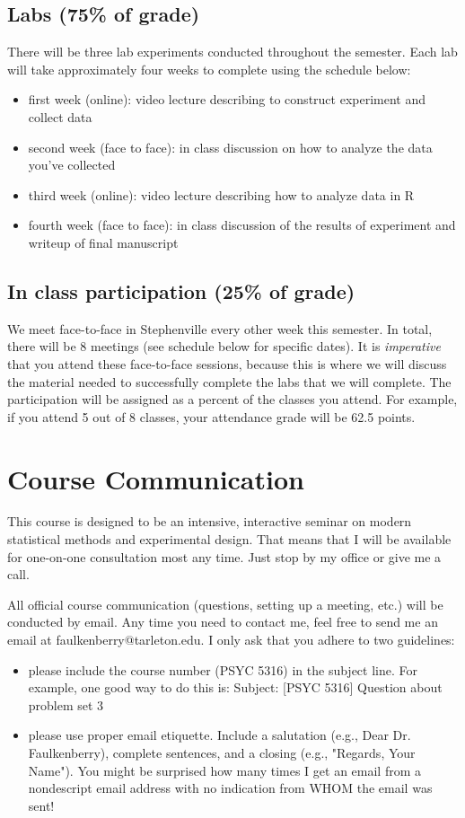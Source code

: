 \documentclass[10pt]{article}
\begin{document}
\subsection*{Labs (75\% of grade)}
\label{sec-5-1}
There will be three lab experiments conducted throughout the semester.  Each lab will take approximately four weeks to complete using the schedule below:

\begin{itemize}
\item first week (online): video lecture describing to construct experiment and collect data
\item second week (face to face): in class discussion on how to analyze the data you've collected
\item third week (online): video lecture describing how to analyze data in R
\item fourth week (face to face): in class discussion of the results of experiment and writeup of final manuscript
\end{itemize}

\subsection*{In class participation (25\% of grade)}
\label{sec-5-2}

We meet face-to-face in Stephenville every other week this semester.  In total, there will be 8 meetings (see schedule below for specific dates).  It is \emph{imperative} that you attend these face-to-face sessions, because this is where we will discuss the material needed to successfully complete the labs that we will complete.  The participation will be assigned as a percent of the classes you attend. For example, if you attend 5 out of 8 classes, your attendance grade will be 62.5 points.

\section*{Course Communication}
\label{sec-6}

This course is designed to be an intensive, interactive seminar on modern statistical methods and experimental design.  That means that I will be available for one-on-one consultation most any time.  Just stop by my office or give me a call.

All official course communication (questions, setting up a meeting, etc.) will be conducted by email.  Any time you need to contact me, feel free to send me an email at faulkenberry@tarleton.edu.  I only ask that you adhere to two guidelines:
\begin{itemize}
\item please include the course number (PSYC 5316) in the subject line.  For example, one good way to do this is:  Subject: [PSYC 5316] Question about problem set 3
\item please use proper email etiquette.  Include a salutation (e.g., Dear Dr. Faulkenberry), complete sentences, and a closing (e.g., "Regards, Your Name").  You might be surprised how many times I get an email from a nondescript email address with no indication from WHOM the email was sent!
\end{itemize}
\end{document}
